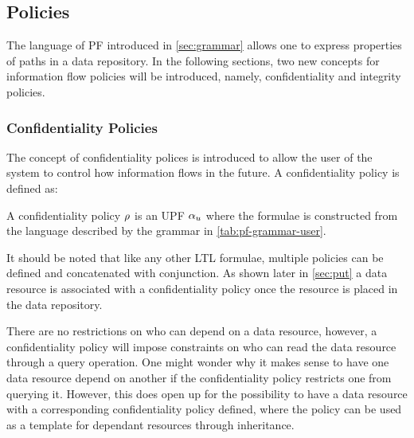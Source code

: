 \subsection{Policies}\label{sec:policies}
The language of PF introduced in \autoref{sec:grammar} allows one to express properties of paths in a data repository. In the following sections, two new concepts for information flow policies will be introduced, namely, confidentiality and integrity policies.

\subsubsection{Confidentiality Policies}
The concept of confidentiality polices is introduced to allow the user of the system to control how information flows in the future. A confidentiality policy is defined as:
\begin{definition}\label{def:cp}
A confidentiality policy $\rho$ is an UPF $\alpha_u$ where the formulae is constructed from the language described by the grammar in \autoref{tab:pf-grammar-user}.
\end{definition}
It should be noted that like any other LTL formulae, multiple policies can be defined and concatenated with conjunction. As shown later in \autoref{sec:put} a data resource is associated with a confidentiality policy once the resource is placed in the data repository. 

There are no restrictions on who can depend on a data resource, however, a confidentiality policy will impose constraints on who can read the data resource through a query operation. One might wonder why it makes sense to have one data resource depend on another if the confidentiality policy restricts one from querying it. However, this does open up for the possibility to have a data resource with a corresponding confidentiality policy defined, where the policy can be used as a template for dependant resources through inheritance.


